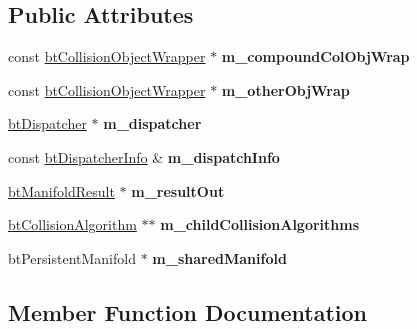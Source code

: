 \subsection*{Public Attributes}
\begin{DoxyCompactItemize}
\item 
\mbox{\label{structbtCompoundLeafCallback_af16bb32915bf909ffe4ba6672514f2af}} 
const \hyperlink{structbtCollisionObjectWrapper}{bt\+Collision\+Object\+Wrapper} $\ast$ {\bfseries m\+\_\+compound\+Col\+Obj\+Wrap}
\item 
\mbox{\label{structbtCompoundLeafCallback_a096ee0c482f6bd286507db9d3e1ab18e}} 
const \hyperlink{structbtCollisionObjectWrapper}{bt\+Collision\+Object\+Wrapper} $\ast$ {\bfseries m\+\_\+other\+Obj\+Wrap}
\item 
\mbox{\label{structbtCompoundLeafCallback_a42a7482c4e324fdc9ce85e88b9e96fe1}} 
\hyperlink{classbtDispatcher}{bt\+Dispatcher} $\ast$ {\bfseries m\+\_\+dispatcher}
\item 
\mbox{\label{structbtCompoundLeafCallback_aaac00f6e3e42c52357ba516521b8f347}} 
const \hyperlink{structbtDispatcherInfo}{bt\+Dispatcher\+Info} \& {\bfseries m\+\_\+dispatch\+Info}
\item 
\mbox{\label{structbtCompoundLeafCallback_aa6c200cd136e8434cbadf7bc93193445}} 
\hyperlink{classbtManifoldResult}{bt\+Manifold\+Result} $\ast$ {\bfseries m\+\_\+result\+Out}
\item 
\mbox{\label{structbtCompoundLeafCallback_aae32b57467dcfb833de4829819bb642b}} 
\hyperlink{classbtCollisionAlgorithm}{bt\+Collision\+Algorithm} $\ast$$\ast$ {\bfseries m\+\_\+child\+Collision\+Algorithms}
\item 
\mbox{\label{structbtCompoundLeafCallback_a4db60ab914ea033b570c25bb4972bdae}} 
bt\+Persistent\+Manifold $\ast$ {\bfseries m\+\_\+shared\+Manifold}
\end{DoxyCompactItemize}


\subsection{Member Function Documentation}
\mbox{\label{structbtCompoundLeafCallback_a447295638bb470ddfbcdd314eb14b6ad}} 
